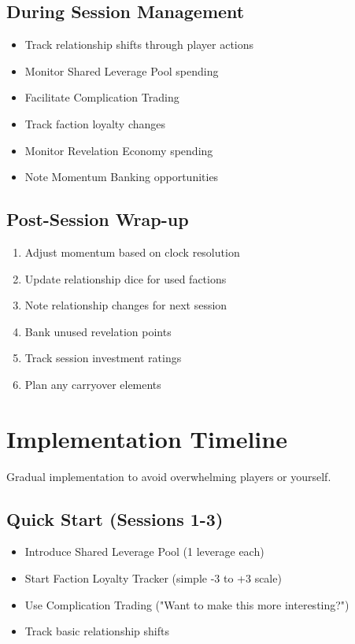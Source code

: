 \subsection{During Session Management}

\begin{itemize}
\item Track relationship shifts through player actions
\item Monitor Shared Leverage Pool spending
\item Facilitate Complication Trading
\item Track faction loyalty changes
\item Monitor Revelation Economy spending
\item Note Momentum Banking opportunities
\end{itemize}

\subsection{Post-Session Wrap-up}

\begin{enumerate}
\item Adjust momentum based on clock resolution
\item Update relationship dice for used factions
\item Note relationship changes for next session
\item Bank unused revelation points
\item Track session investment ratings
\item Plan any carryover elements
\end{enumerate}

\section{Implementation Timeline}

Gradual implementation to avoid overwhelming players or yourself.

\subsection{Quick Start (Sessions 1-3)}

\begin{itemize}
\item Introduce Shared Leverage Pool (1 leverage each)
\item Start Faction Loyalty Tracker (simple -3 to +3 scale)
\item Use Complication Trading ("Want to make this more interesting?")
\item Track basic relationship shifts
\end{itemize}

